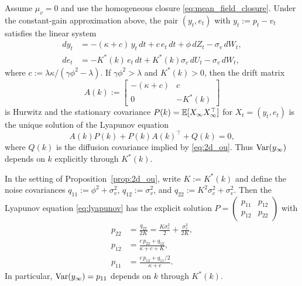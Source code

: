 \begin{proposition}
\label{prop:2d_ou}
Assume $\mu_v=0$ and use the homogeneous closure \eqref{eq:mean_field_closure}. Under the constant-gain approximation above, the pair
$(y_t,e_t)$ with $y_t:=p_t-v_t$ satisfies the linear system
\begin{align}
dy_t &= -(\kappa+c)\,y_t\,dt + c\,e_t\,dt + \phi\,dZ_t - \sigma_v\,dW_t,\nonumber\\
de_t &= -K^*(k)\,e_t\,dt + K^*(k)\sigma_c\,dU_t - \sigma_v\,dW_t,
\label{eq:2d_ou}
\end{align}
where $c:=\lambda\kappa/(\gamma\phi^2-\lambda)$.
If $\gamma\phi^2>\lambda$ and $K^*(k)>0$, then the drift matrix
\[
A(k):=\begin{bmatrix}-(\kappa+c) & c\\ 0 & -K^*(k)\end{bmatrix}
\]
is Hurwitz and the stationary covariance $P(k)=\mathbb{E}[X_\infty X_\infty^\top]$ for $X_t=(y_t,e_t)$ is the unique solution of the Lyapunov equation
\begin{equation}
A(k)P(k)+P(k)A(k)^\top + Q(k) = 0,
\label{eq:lyapunov}
\end{equation}
where $Q(k)$ is the diffusion covariance implied by \eqref{eq:2d_ou}. Thus $\text{Var}(y_\infty)$ depends on $k$ explicitly through $K^*(k)$.
\end{proposition}

\begin{corollary}
\label{cor:2d_ou_closed_form}
In the setting of Proposition~\ref{prop:2d_ou}, write $K:=K^*(k)$ and define the noise covariances
$q_{11}:=\phi^2+\sigma_v^2$, $q_{12}:=\sigma_v^2$, and $q_{22}:=K^2\sigma_c^2+\sigma_v^2$.
Then the Lyapunov equation \eqref{eq:lyapunov} has the explicit solution $P=\begin{pmatrix}p_{11}&p_{12}\\p_{12}&p_{22}\end{pmatrix}$ with
\begin{equation}
\begin{aligned}
p_{22}&=\frac{q_{22}}{2K}=\frac{K\sigma_c^2}{2}+\frac{\sigma_v^2}{2K},\\
p_{12}&=\frac{c\,p_{22}+q_{12}}{\kappa+c+K},\\
p_{11}&=\frac{c\,p_{12}+q_{11}/2}{\kappa+c}.
\end{aligned}
\end{equation}
In particular, $\text{Var}(y_\infty)=p_{11}$ depends on $k$ through $K^*(k)$.
\end{corollary}

